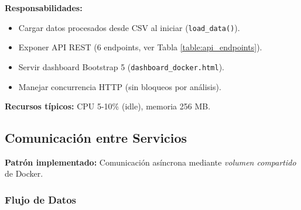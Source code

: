 \textbf{Responsabilidades:}
\begin{itemize}
    \item Cargar datos procesados desde CSV al iniciar (\texttt{load\_data()}).
    \item Exponer API REST (6 endpoints, ver Tabla \ref{table:api_endpoints}).
    \item Servir dashboard Bootstrap 5 (\texttt{dashboard\_docker.html}).
    \item Manejar concurrencia HTTP (sin bloqueos por análisis).
\end{itemize}

\textbf{Recursos típicos:} CPU 5-10\% (idle), memoria 256 MB.

\subsection{Comunicación entre Servicios}
\label{subsec:comunicacion_servicios}

\textbf{Patrón implementado:} Comunicación asíncrona mediante \textit{volumen compartido} de Docker.

\subsubsection{Flujo de Datos}

